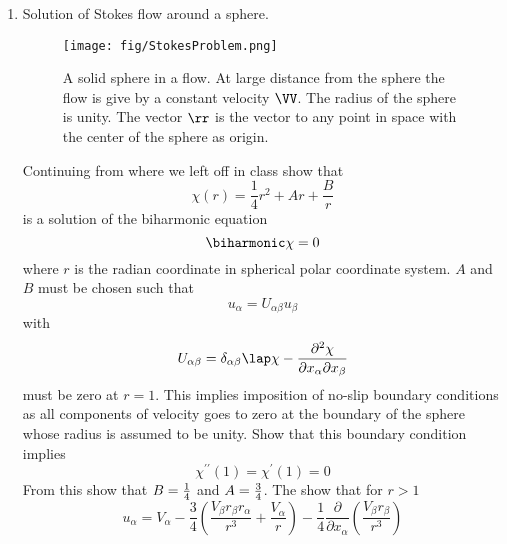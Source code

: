 \documentclass[a4paper,twoside,10pt]{article}
\begin{document}
\begin {enumerate}

\item Solution of Stokes flow around a sphere. 
\begin{figure}[h]
\texttt{[image: fig/StokesProblem.png]}
\caption{\small{A solid sphere in a flow. At large distance from the sphere
  the flow is give by a constant velocity $\VV$. The radius of the
  sphere is unity. The vector $\rr$ is the vector to any point in
  space with the center of the sphere as origin. }
}\label{fig:st}
\end{figure}
Continuing from where we left off in class show that 
\begin{equation}
\chi(r) = \frac{1}{4}r^2 + Ar + \frac{B}{r}
\end{equation}
is a solution of the biharmonic equation
\begin{equation}
\biharmonic \chi = 0 
\end{equation}
where $r$ is the radian coordinate in spherical polar coordinate
system. $A$ and $B$ must be chosen such that 
\begin{equation}
u_{\alpha} = U_{\alpha\beta}u_{\beta} 
\end{equation}
with 
\begin{equation}
U_{\alpha\beta} = \delta_{\alpha\beta}\lap \chi - \frac{\partial^2 \chi}{\partial
  x_{\alpha}\partial x_{\beta}}
\end{equation}
must be zero at $r=1$. This implies imposition of no-slip boundary
conditions as all components of velocity goes to zero at the boundary
of the sphere whose radius is assumed to be unity. 
Show that this boundary condition implies 
\begin{equation}
\chi^{\prime\prime}(1) = \chi^{\prime}(1) = 0  
\end{equation}
From this show that 
$B={\textstyle{1\over 4}}$ and
$A={\textstyle{3\over 4}}$.
The show that for $r > 1$ 
\begin{equation}
u_{\alpha} = V_{\alpha} - \frac{3}{4}\left(
  \frac{V_{\beta}r_{\beta}r_{\alpha}}{r^3} + \frac{V_{\alpha}}{r}
    \right)
-\frac{1}{4}\frac{\partial}{\partial x_{\alpha}}\left( \frac{V_{\beta}r_{\beta}}{r^3}\right)
\end{equation}


\end{enumerate}
\end{document}
